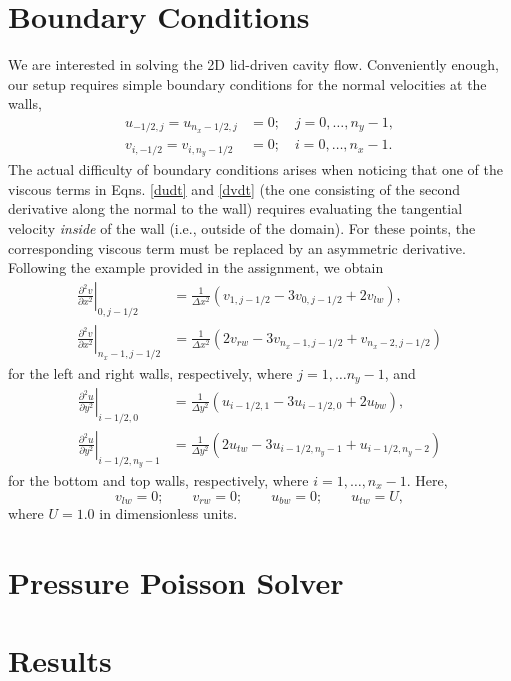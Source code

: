 \documentclass[11pt]{article}
\begin{document}
\section{Boundary Conditions}

We are interested in solving the 2D lid-driven cavity flow. Conveniently enough, our setup requires simple boundary conditions for the normal velocities at the walls,
\begin{align}
u_{-1/2,j} = u_{n_x - 1/2,j} &= 0;\quad j = 0,\hdots,n_y-1,\\
v_{i,-1/2} = v_{i,n_y - 1/2} &= 0;\quad i = 0,\hdots,n_x-1.
\end{align}
The actual difficulty of boundary conditions arises when noticing that one of the viscous terms in Eqns. \eqref{dudt} and \eqref{dvdt} (the one consisting of the second derivative along the normal to the wall) requires evaluating the tangential velocity \emph{inside} of the wall (i.e., outside of the domain). For these points, the corresponding viscous term must be replaced by an asymmetric derivative. Following the example provided in the assignment, we obtain
\begin{align}
\left.\frac{\partial^2 v}{\partial x^2}\right|_{0,j-1/2} 
&= \frac{1}{\Delta x^2}\left( v_{1,j-1/2} - 3v_{0,j-1/2} + 2v_{lw} \right),\\
\left.\frac{\partial^2 v}{\partial x^2}\right|_{n_x-1,j-1/2}
&= \frac{1}{\Delta x^2}\left( 2v_{rw} - 3v_{n_x-1,j-1/2} + v_{n_x-2,j-1/2} \right)
\end{align}
for the left and right walls, respectively, where $j=1,\hdots n_y-1$, and 
\begin{align}
\left.\frac{\partial^2 u}{\partial y^2}\right|_{i-1/2,0}
&= \frac{1}{\Delta y^2}\left( u_{i-1/2,1} - 3u_{i-1/2,0} + 2u_{bw} \right),\\
\left.\frac{\partial^2 u}{\partial y^2}\right|_{i-1/2,n_y-1} 
&= \frac{1}{\Delta y^2}\left( 2u_{tw} - 3u_{i-1/2,n_y-1} + u_{i-1/2,n_y-2} \right)
\end{align}
for the bottom and top walls, respectively, where $i = 1,\hdots, n_x-1$. Here,
\begin{equation}
v_{lw} = 0;\qquad v_{rw} = 0;\qquad u_{bw} = 0;\qquad u_{tw} = U,
\end{equation}
where $U = 1.0$ in dimensionless units.

\section{Pressure Poisson Solver}


	
\section{Results}
\end{document}
